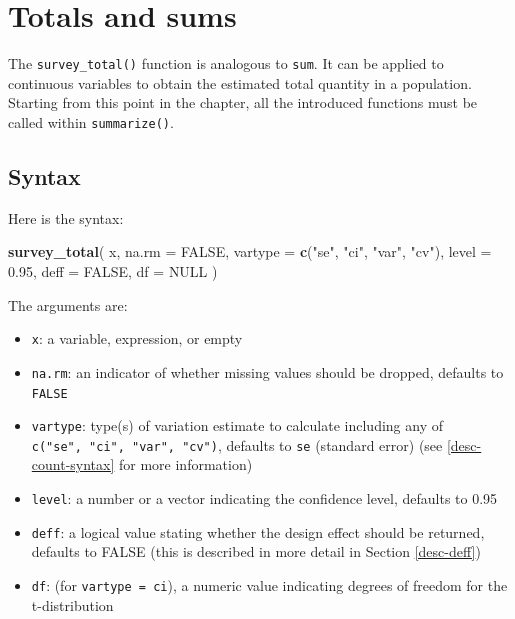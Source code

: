 \documentclass[
]{krantz}
\makeatletter
\newenvironment{Shaded}{\begin{snugshade}}{\end{snugshade}}
\newcommand{\AttributeTok}[1]{\textcolor[rgb]{0.27,0.27,0.27}{#1}}
\newcommand{\ConstantTok}[1]{\textcolor[rgb]{0.37,0.37,0.37}{#1}}
\newcommand{\FloatTok}[1]{\textcolor[rgb]{0.06,0.06,0.06}{#1}}
\newcommand{\FunctionTok}[1]{\textcolor[rgb]{0.27,0.27,0.27}{\textbf{#1}}}
\newcommand{\NormalTok}[1]{#1}
\newcommand{\StringTok}[1]{\textcolor[rgb]{0.5,0.5,0.5}{#1}}
\providecommand{\tightlist}{%
  \setlength{\itemsep}{0pt}\setlength{\parskip}{0pt}}
\newenvironment{kframe}{%
\medskip{}
\setlength{\fboxsep}{.8em}
 \def\at@end@of@kframe{}%
 \ifinner\ifhmode%
  \def\at@end@of@kframe{\end{minipage}}%
  \begin{minipage}{\columnwidth}%
 \fi\fi%
 \def\FrameCommand##1{\hskip\@totalleftmargin \hskip-\fboxsep
 \colorbox{shadecolor}{##1}\hskip-\fboxsep
     \hskip-\linewidth \hskip-\@totalleftmargin \hskip\columnwidth}%
 \MakeFramed {\advance\hsize-\width
   \@totalleftmargin\z@ \linewidth\hsize
   \@setminipage}}%
 {\par\unskip\endMakeFramed%
 \at@end@of@kframe}
\renewenvironment{Shaded}{\begin{kframe}}{\end{kframe}}
\makeatother
\begin{document}
\hypertarget{totals-and-sums}{%
\section{Totals and sums}\label{totals-and-sums}}

The \texttt{survey\_total()} function is analogous to \texttt{sum}. It can be applied to continuous variables to obtain the estimated total quantity in a population. Starting from this point in the chapter, all the introduced functions must be called within \texttt{summarize()}.

\hypertarget{syntax}{%
\subsection{Syntax}\label{syntax}}

Here is the syntax:

\begin{Shaded}
\begin{Highlighting}[]
\FunctionTok{survey\_total}\NormalTok{(}
\NormalTok{  x,}
  \AttributeTok{na.rm =} \ConstantTok{FALSE}\NormalTok{,}
  \AttributeTok{vartype =} \FunctionTok{c}\NormalTok{(}\StringTok{"se"}\NormalTok{, }\StringTok{"ci"}\NormalTok{, }\StringTok{"var"}\NormalTok{, }\StringTok{"cv"}\NormalTok{),}
  \AttributeTok{level =} \FloatTok{0.95}\NormalTok{,}
  \AttributeTok{deff =} \ConstantTok{FALSE}\NormalTok{,}
  \AttributeTok{df =} \ConstantTok{NULL}
\NormalTok{)}
\end{Highlighting}
\end{Shaded}

The arguments are:

\begin{itemize}
\tightlist
\item
  \texttt{x}: a variable, expression, or empty
\item
  \texttt{na.rm}: an indicator of whether missing values should be dropped, defaults to \texttt{FALSE}
\item
  \texttt{vartype}: type(s) of variation estimate to calculate including any of \texttt{c("se",\ "ci",\ "var",\ "cv")}, defaults to \texttt{se} (standard error) (see \ref{desc-count-syntax} for more information)
\item
  \texttt{level}: a number or a vector indicating the confidence level, defaults to 0.95
\item
  \texttt{deff}: a logical value stating whether the design effect should be returned, defaults to FALSE (this is described in more detail in Section \ref{desc-deff})
\item
  \texttt{df}: (for \texttt{vartype\ =\ \textquotesingle{}ci\textquotesingle{}}), a numeric value indicating degrees of freedom for the t-distribution
\end{itemize}
\end{document}
